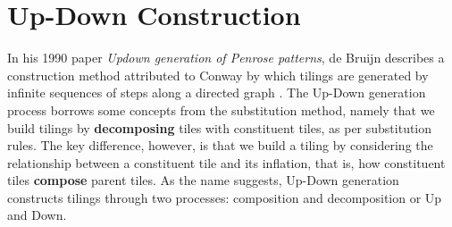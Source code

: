 \documentclass[
  oneside,
  11pt, a4paper,
  footinclude=true,
  headinclude=true,
  cleardoublepage=empty
]{scrbook}
\begin{document}
\chapter{Up-Down Construction} %

In his 1990 paper \textit{Updown generation of Penrose patterns}, de Bruijn describes a construction method attributed to Conway by which tilings are generated by infinite sequences of steps along a directed graph \cite{DeBruijn1990}. The Up-Down generation process borrows some concepts from the substitution method, namely that we build tilings by \textbf{decomposing} tiles with constituent tiles, as per substitution rules. The key difference, however, is that we build a tiling by considering the relationship between a constituent tile and its inflation, that is, how constituent tiles \textbf{compose} parent tiles. As the name suggests, Up-Down generation constructs tilings through two processes: composition and decomposition or Up and Down.
\end{document}
